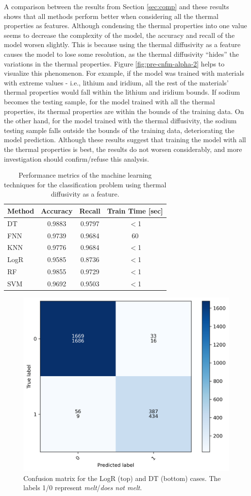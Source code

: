 A comparison between the results from Section \ref{sec:comp} and these results shows that all methods perform better when considering all the thermal properties as features.
Although condensing the thermal properties into one value seems to decrease the complexity of the model, the accuracy and recall of the model worsen slightly.
This is because using the thermal diffusivity as a feature causes the model to lose some resolution, as the thermal diffusivity ``hides'' the variations in the thermal properties.
Figure \ref{fig:pre-cnfm-alpha-2} helps to visualize this phenomenon.
For example, if the model was trained with materials with extreme values - i.e., lithium and iridium, all the rest of the materials' thermal properties would fall within the lithium and iridium bounds.
If sodium becomes the testing sample, for the model trained with all the thermal properties, its thermal properties are within the bounds of the training data.
On the other hand, for the model trained with the thermal diffusivity, the sodium testing sample falls outside the bounds of the training data, deteriorating the model prediction.
Although these results suggest that training the model with all the thermal properties is best, the results do not worsen considerably, and more investigation should confirm/refuse this analysis.

\begin{table}[htbp!]
  \centering
  \caption{Performance metrics of the machine learning techniques for the classification problem using thermal diffusivity as a feature.}
  \label{tab:res-pre-alpha}
  \begin{tabular}{lccc}
    \toprule
    Method & Accuracy & Recall & Train Time [sec] \\
    \midrule
    DT      & 0.9883 & 0.9797 & $<$1 \\
    FNN     & 0.9739 & 0.9684 &   60 \\
    KNN     & 0.9776 & 0.9684 & $<$1 \\
    LogR    & 0.9585 & 0.8736 & $<$1 \\
    RF      & 0.9855 & 0.9729 & $<$1 \\
    SVM     & 0.9692 & 0.9503 & $<$1 \\
    \bottomrule
  \end{tabular}
\end{table}

\begin{figure}[htbp!] %
    \centering
    \includegraphics[width=0.45\linewidth]{figures/classification-alpha_cnfm}
    \hfill
    \caption{Confusion matrix for the LogR (top) and DT (bottom) cases. The labels 1/0 represent \textit{melt}/\textit{does not melt}.}
    \label{fig:pre-cnfm-alpha}
\end{figure}

